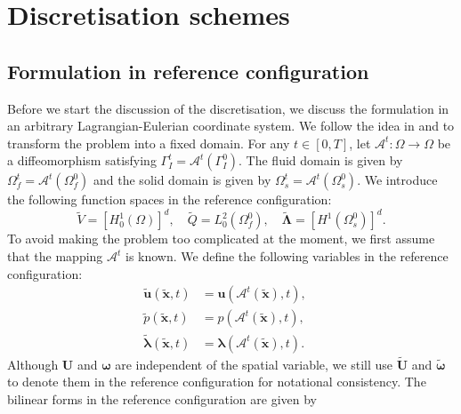 \documentclass{article}
\newcommand{\bU}{{\mathbf{U}}}
\newcommand{\bx}{{\mathbf{x}}}
\newcommand{\bu}{{\mathbf{u}}}
\newcommand\tu{{\tilde{\mathbf{u}}}}
\newcommand\tU{{\tilde{\mathbf{U}}}}
\newcommand\tp{{\tilde{{p}}}}
\newcommand\tomega{{\tilde{\boldsymbol{\omega}}}}
\begin{document}
\section{Discretisation schemes}
\subsection{Formulation in reference configuration}

Before we start the discussion of the discretisation, we discuss the formulation in an arbitrary Lagrangian-Eulerian coordinate system. We follow the idea in \cite{gawlik2014high} and \cite{gawlik2015unified} to transform the problem into a fixed domain. For any $t\in[0,T]$, let $\mathcal{A}^t:\Omega \to \Omega$ be a diffeomorphism satisfying  $\Gamma_I^t = \mathcal{A}^t(\Gamma_I^0)$. The fluid domain is given by $\Omega_f^t = \mathcal{A}^t(\Omega_f^0)$ and the solid domain is given by $\Omega_s^t = \mathcal{A}^t(\Omega_s^0)$.  
We introduce the following function spaces in the reference configuration:
\begin{equation}
    \tilde{V} = [H^1_0(\Omega)]^d,\quad \tilde{Q} = L^2_0(\Omega_f^0),\quad \tilde{\boldsymbol{\Lambda}} =[H^1(\Omega_s^0)]^d.
\end{equation}
To avoid making the problem too complicated at the moment, we first assume that the mapping $\mathcal{A}^t$ is known. 
We define the following variables in the reference configuration:
\begin{equation}\label{eq:equivalence_coordinate}
    \begin{aligned}
    \tu(\tilde{\bx},t) &= \bu(\mathcal{A}^t(\tilde{\bx}),t),\quad\\
    \tp(\tilde{\bx},t) &= p(\mathcal{A}^t(\tilde{\bx}),t),\quad\\
    \tilde{\boldsymbol{\lambda}}(\tilde{\bx},t) &= \boldsymbol{\lambda}(\mathcal{A}^t(\tilde{\bx}),t).
\end{aligned}
\end{equation}
Although $\bU$ and $\boldsymbol{\omega}$ are independent of the spatial variable, we still use $\tU$ and $\tomega$ to denote them in the reference configuration for notational consistency. 
The bilinear forms in the reference configuration are given by
\end{document}
